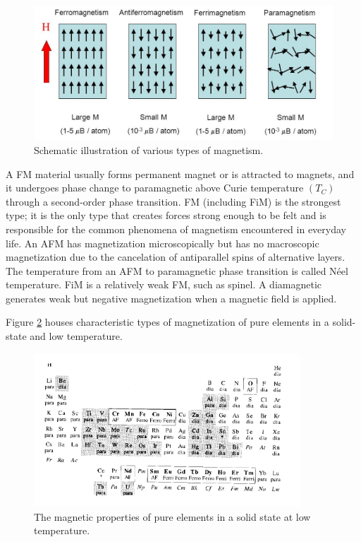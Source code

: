 \begin{figure}[H]
	\centering
	\includegraphics[width=130mm]{fig/review/magneticorder.png}
	\caption[Schematic illustration of various types of magnetism.]{Schematic illustration of various types of magnetism.}
\label{fig:magneticorder}
\end{figure}

A FM material usually forms permanent magnet or is attracted to magnets, and it undergoes phase change to paramagnetic above Curie temperature $(T_C)$ through a second-order phase transition.
FM (including FiM) is the strongest type; it is the only type that creates forces strong enough to be felt and is responsible for the common phenomena of magnetism encountered in everyday life.
An AFM has magnetization microscopically but has no macroscopic magnetization due to the cancelation of antiparallel spins of alternative layers. 
The temperature from an AFM to paramagnetic phase transition is called Néel temperature. FiM is a relatively weak FM, such as  spinel. A diamagnetic generates weak but negative magnetization when a magnetic field is applied. 

Figure \ref{fig:table2} houses characteristic types of magnetization of pure elements in a solid-state and low temperature.

\begin{figure}[H]
	\centering
	\includegraphics[width=100mm]{fig/review/tabel2.png}
	\caption[Magnetic properties of pure elements]{The magnetic properties of pure elements in a solid state at low temperature.}
	\label{fig:table2}
\end{figure}




